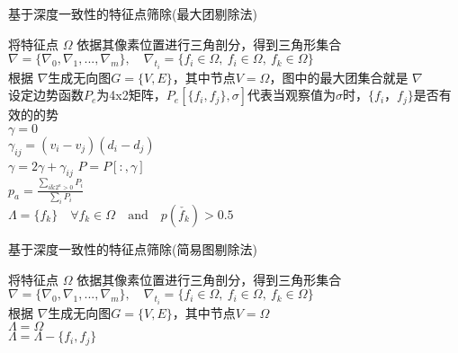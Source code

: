 \begin{algorithm}
    \caption{基于深度一致性的特征点筛除(最大团剔除法)}
    将特征点 $\Omega$ 依据其像素位置进行三角剖分，得到三角形集合$\nabla =\{\nabla_0,\nabla_1,...,\nabla_m\},\quad \nabla_{t_i}=\{f_i\in\Omega,\ f_i\in\Omega,\ f_k\in\Omega\}$\\
    根据 $\nabla$生成无向图$G=\{V,E\}$，其中节点$V=\Omega$，图中的最大团集合就是 $\nabla$ \\
    设定边势函数$P_e$为4x2矩阵，$P_e[\{f_i,f_j \},\sigma]$代表当观察值为$\sigma$时，$\{f_i，f_j\}$是否有效的的势\\
    {   $\gamma=0$\\
        {
            $\gamma_{ij}= (v_i-v_j)(d_i-d_j)$\\
            $\gamma=2\gamma+\gamma_{ij}$
        } 
        $P = P[:,\gamma]$\\
        $p_a = \frac{\sum_{i\&{2^a}>0} P_i}{\sum_i{P_i}}$\\
        
    }
    $\Lambda = \{f_k\} \quad \forall f_k \in  \Omega \quad \text{and} \quad  p(\check{f_k})>0.5$
  \label{alg:depth_rejection_4}
\end{algorithm}
\begin{algorithm}
    \caption{基于深度一致性的特征点筛除(简易图剔除法)}
    将特征点 $\Omega$ 依据其像素位置进行三角剖分，得到三角形集合$\nabla =\{\nabla_0,\nabla_1,...,\nabla_m\},\quad \nabla_{t_i}=\{f_i\in\Omega,\ f_i\in\Omega,\ f_k\in\Omega\}$\\
    根据 $\nabla$生成无向图$G=\{V,E\}$，其中节点$V=\Omega$ \\
    $\Lambda = \Omega$\\
    {   
        {
            {
                $\Lambda = \Lambda - \{f_i,f_j\}$
            }
        }
    }
  \label{alg:depth_rejection_2}
\end{algorithm}

